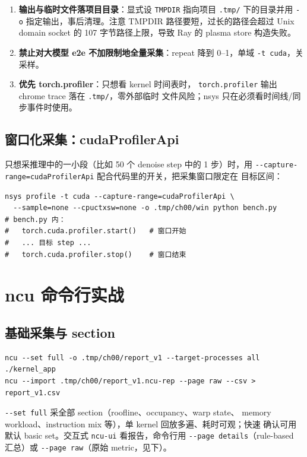 \begin{enumerate}
\item \textbf{输出与临时文件落项目目录}：显式设 \texttt{TMPDIR} 指向项目
  \texttt{.tmp/} 下的目录并用 \texttt{-o} 指定输出，事后清理。注意 TMPDIR
  路径要短，过长的路径会超过 Unix domain socket 的 107 字节路径上限，导致
  Ray 的 plasma store 构造失败。
\item \textbf{禁止对大模型 e2e 不加限制地全量采集}：repeat 降到 0--1，单域
  \texttt{-t cuda}，关采样。
\item \textbf{优先 torch.profiler}：只想看 kernel 时间表时，
  \texttt{torch.\allowbreak{}profiler} 输出 chrome trace 落在 \texttt{.tmp/}，零外部临时
  文件风险；nsys 只在必须看时间线/同步事件时使用。
\end{enumerate}

\subsection{窗口化采集：cudaProfilerApi}

只想采推理中的一小段（比如 50 个 denoise step 中的 1 步）时，用
\texttt{-{}-capture-range=\allowbreak{}cuda\allowbreak{}Profiler\allowbreak{}Api} 配合代码里的开关，把采集窗口限定在
目标区间：

\begin{lstlisting}[style=console, title={窗口化采集（Python 侧）}]
nsys profile -t cuda --capture-range=cudaProfilerApi \
  --sample=none --cpuctxsw=none -o .tmp/ch00/win python bench.py
# bench.py 内：
#   torch.cuda.profiler.start()   # 窗口开始
#   ... 目标 step ...
#   torch.cuda.profiler.stop()    # 窗口结束
\end{lstlisting}

\section{ncu 命令行实战}\label{sec:ch00-ncu}

\subsection{基础采集与 section}

\begin{lstlisting}[style=console, title={ncu 全量采集与 CSV 导出}]
ncu --set full -o .tmp/ch00/report_v1 --target-processes all ./kernel_app
ncu --import .tmp/ch00/report_v1.ncu-rep --page raw --csv > report_v1.csv
\end{lstlisting}

\texttt{-{}-set full} 采全部 section（roofline、occupancy、warp state、
memory workload、instruction mix 等），单 kernel 回放多遍、耗时可观；快速
确认可用默认 basic set。交互式 \texttt{ncu-ui} 看报告，命令行用
\texttt{-{}-page details}（rule-based 汇总）或 \texttt{-{}-page raw}（原始
metric，见下）。

